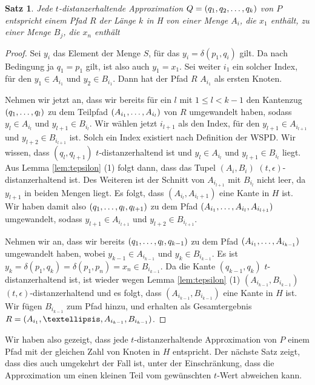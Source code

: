 \documentclass[11pt]{article}
\newtheorem{theorem}{Satz}[section]
\begin{document}
	\begin{theorem}
		\label{theo:Approx2H}
		Jede $t$-distanzerhaltende Approximation $Q = (q_1, q_2, \mathellipsis, q_k)$ von $P$ entspricht einem Pfad $R$ der Länge $k$ in H von einer Menge $A_i$, die $x_1$ enthält, zu einer Menge $B_j$, die $x_n$ enthält
	\end{theorem}
	\begin{proof}
		Sei $y_i$ das Element der Menge $S$, für das $y_i = \delta(p_1, q_i)$ gilt. Da nach Bedingung ja $q_1 = p_1$ gilt, ist also auch $y_1 = x_1$.
		Sei weiter $i_1$ ein solcher Index, für den $y_1 \in A_{i_1}$ und $y_2 \in B_{i_1}$. Dann hat der Pfad $R$ $A_{i_1}$ als ersten Knoten.
		
		Nehmen wir jetzt an, dass wir bereits für ein $l$ mit $1 \leq l < k-1$ den Kantenzug $(q_1, \mathellipsis, q_l)$ zu dem Teilpfad $(A_{i_1}, \mathellipsis, A_{i_l})$ von $R$ umgewandelt haben, sodass $y_l \in A_{i_l}$ und $y_{l+1} \in B_{i_l}$. Wir wählen jetzt $i_{l+1}$ als den Index, für den $y_{l+1} \in A_{i_{l+1}}$ und $y_{l+2} \in B_{i_{l+1}}$ ist. Solch ein Index existiert nach Definition der WSPD. Wir wissen, dass $(q_l, q_{l+1})$ $t$-distanzerhaltend ist und $y_l \in A_{i_l}$ und $y_{l+1} \in B_{i_l} $ liegt. Aus Lemma \ref{lem:tepsilon} (1) folgt dann, dass das Tupel $(A_i, B_i)$ $(t, \epsilon)$-distanzerhaltend ist. Des Weiteren ist der Schnitt von $A_{i_{l+1}}$ mit $B_{i_l}$ nicht leer, da $y_{l+1}$ in beiden Mengen liegt. Es folgt, dass $(A_{i_l}, A_{i_l+1})$ eine Kante in $H$ ist. Wir haben damit also $(q_1, \mathellipsis, q_l, q_{l+1})$ zu dem Pfad $(A_{i_1}, \mathellipsis, A_{i_l}, A_{i_{l+1}})$ umgewandelt, sodass $y_{l+1} \in A_{i_{l+1}}$ und $y_{l+2} \in B_{i_{l+1}}$.
		
		Nehmen wir an, dass wir bereits $(q_1, \mathellipsis, q_l, q_{k-1})$ zu dem Pfad $(A_{i_1}, \mathellipsis, A_{i_{k-1}})$ umgewandelt haben, wobei $y_{k-1} \in A_{i_{k-1}}$ und $y_k \in B_{i_{k-1}}$. Es ist $y_k = \delta(p_1, q_k) = \delta(p_1, p_n) = x_n \in B_{i_{k-1}}$. Da die Kante $(q_{k-1}, q_k)$ $t$-distanzerhaltend ist, ist wieder wegen Lemma \ref{lem:tepsilon} (1) $(A_{i_{k-1}}, B_{i_{k-1}})$ $(t, \epsilon)$-distanzerhaltend und es folgt, dass $(A_{i_{k-1}}, B_{i_{k-1}})$ eine Kante in $H$ ist. Wir fügen $B_{i_{k-1}}$ zum Pfad hinzu, und erhalten als Gesamtergebnis $R = (A_{i_1}, \textellipsis, A_{i_{k-1}}, B_{i_{k-1}})$.
	\end{proof}
	
	Wir haben also gezeigt, dass jede $t$-distanzerhaltende Approximation von $P$ einem Pfad mit der gleichen Zahl von Knoten in $H$ entspricht. Der nächste Satz zeigt, dass dies auch umgekehrt der Fall ist, unter der Einschränkung, dass die Approximation um einen kleinen Teil vom gewünschten $t$-Wert abweichen kann.
	
\end{document}
